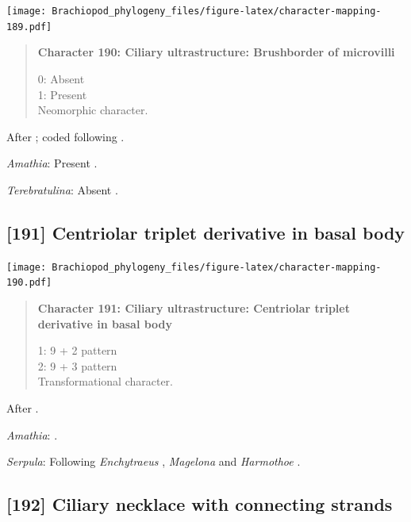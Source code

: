 \documentclass[openany]{book}
\begin{document}
\texttt{[image: Brachiopod\_phylogeny\_files/figure-latex/character-mapping-189.pdf]}

\begin{quote}
\textbf{Character 190: Ciliary ultrastructure: Brushborder of
microvilli}

0: Absent\\
1: Present\\
Neomorphic character.
\end{quote}

After \citet{Lundin2009}; coded following \citet{Smith2012}.

\hypertarget{Amathia-coding-190}{}
\emph{Amathia}: Present \citep{Reed1982}.

\hypertarget{Terebratulina-coding-190}{}
\emph{Terebratulina}: Absent \citep{Luter1995}.

\subsection*{{[}191{]} Centriolar triplet derivative in basal
body}\label{centriolar-triplet-derivative-in-basal-body}

\texttt{[image: Brachiopod\_phylogeny\_files/figure-latex/character-mapping-190.pdf]}

\begin{quote}
\textbf{Character 191: Ciliary ultrastructure: Centriolar triplet
derivative in basal body}

1: 9 + 2 pattern\\
2: 9 + 3 pattern\\
Transformational character.
\end{quote}

After \citet{Lundin2009}.

\hypertarget{Amathia-coding-191}{}
\emph{Amathia}: \citet{Reed1982}.

\hypertarget{Serpula-coding-191}{}
\emph{Serpula}: Following \emph{Enchytraeus} \citep{Reger1967},
\emph{Magelona} \citep{Bartolomaeus1995} and \emph{Harmothoe}
\citep{Holborow1969}.

\subsection*{{[}192{]} Ciliary necklace with connecting
strands}\label{ciliary-necklace-with-connecting-strands}
\end{document}
